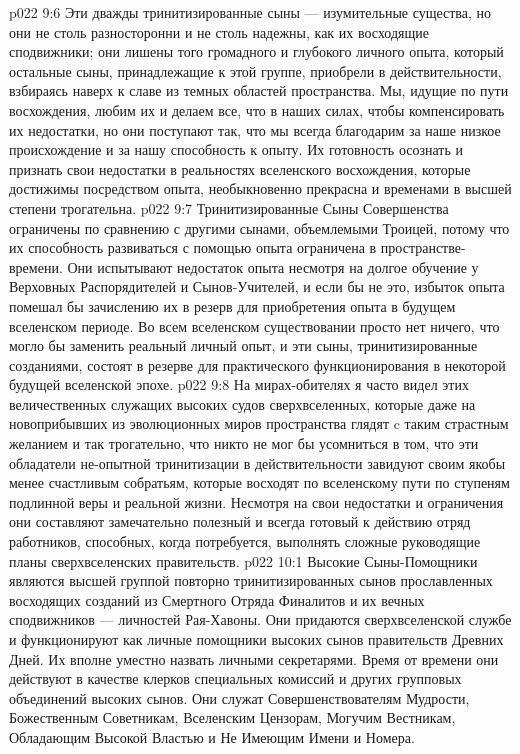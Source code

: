 \vs p022 9:6 Эти дважды тринитизированные сыны --- изумительные существа, но они не столь разносторонни и не столь надежны, как их восходящие сподвижники; они лишены того громадного и глубокого личного опыта, который остальные сыны, принадлежащие к этой группе, приобрели в действительности, взбираясь наверх к славе из темных областей пространства. Мы, идущие по пути восхождения, любим их и делаем все, что в наших силах, чтобы компенсировать их недостатки, но они поступают так, что мы всегда благодарим за наше низкое происхождение и за нашу способность к опыту. Их готовность осознать и признать свои недостатки в реальностях вселенского восхождения, которые достижимы посредством опыта, необыкновенно прекрасна и временами в высшей степени трогательна.
\vs p022 9:7 Тринитизированные Сыны Совершенства ограничены по сравнению с другими сынами, объемлемыми Троицей, потому что их способность развиваться с помощью опыта ограничена в пространстве\hyp{}времени. Они испытывают недостаток опыта несмотря на долгое обучение у Верховных Распорядителей и Сынов\hyp{}Учителей, и если бы не это, избыток опыта помешал бы зачислению их в резерв для приобретения опыта в будущем вселенском периоде. Во всем вселенском существовании просто нет ничего, что могло бы заменить реальный личный опыт, и эти сыны, тринитизированные созданиями, состоят в резерве для практического функционирования в некоторой будущей вселенской эпохе.
\vs p022 9:8 На мирах\hyp{}обителях я часто видел этих величественных служащих высоких судов сверхвселенных, которые даже на новоприбывших из эволюционных миров пространства глядят c таким страстным желанием и так трогательно, что никто не мог бы усомниться в том, что эти обладатели не\hyp{}опытной тринитизации в действительности завидуют своим якобы менее счастливым собратьям, которые восходят по вселенскому пути по ступеням подлинной веры и реальной жизни. Несмотря на свои недостатки и ограничения они составляют замечательно полезный и всегда готовый к действию отряд работников, способных, когда потребуется, выполнять сложные руководящие планы сверхвселенских правительств.
\vs p022 10:1 Высокие Сыны\hyp{}Помощники являются высшей группой повторно тринитизированных сынов прославленных восходящих созданий из Смертного Отряда Финалитов и их вечных сподвижников --- личностей Рая\hyp{}Хавоны. Они придаются сверхвселенской службе и функционируют как личные помощники высоких сынов правительств Древних Дней. Их вполне уместно назвать личными секретарями. Время от времени они действуют в качестве клерков специальных комиссий и других групповых объединений высоких сынов. Они служат Совершенствователям Мудрости, Божественным Советникам, Вселенским Цензорам, Могучим Вестникам, Обладающим Высокой Властью и Не Имеющим Имени и Номера.
